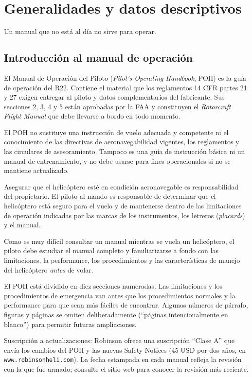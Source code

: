 \chapter{Generalidades y datos descriptivos}
\label{cap:generalidades}

\opening{Un manual que no está al día no sirve para operar.}

\section{Introducción al manual de operación}

El Manual de Operación del Piloto (\emph{Pilot's Operating Handbook}, POH) es la guía de operación del R22. Contiene el material que los reglamentos 14 CFR partes 21 y 27 exigen entregar al piloto y datos complementarios del fabricante. Sus secciones 2, 3, 4 y 5 están aprobadas por la FAA y constituyen el \emph{Rotorcraft Flight Manual} que debe llevarse a bordo en todo momento.

El POH no sustituye una instrucción de vuelo adecuada y competente ni el conocimiento de las directivas de aeronavegabilidad vigentes, los reglamentos y las circulares de asesoramiento. Tampoco es una guía de instrucción básica ni un manual de entrenamiento, y no debe usarse para fines operacionales si no se mantiene actualizado.

Asegurar que el helicóptero esté en condición aeronavegable es responsabilidad del propietario. El piloto al mando es responsable de determinar que el helicóptero está seguro para el vuelo y de mantenerse dentro de las limitaciones de operación indicadas por las marcas de los instrumentos, los letreros (\emph{placards}) y el manual.

Como es muy difícil consultar un manual mientras se vuela un helicóptero, el piloto debe estudiar el manual completo y familiarizarse a fondo con las limitaciones, la performance, los procedimientos y las características de manejo del helicóptero \emph{antes} de volar.

El POH está dividido en diez secciones numeradas. Las limitaciones y los procedimientos de emergencia van antes que los procedimientos normales y la performance para que sean más fáciles de encontrar. Algunos números de párrafo, figuras y páginas se omiten deliberadamente (``páginas intencionalmente en blanco'') para permitir futuras ampliaciones.

\begin{nota}
Suscripción a actualizaciones: Robinson ofrece una suscripción ``Clase A'' que envía los cambios del POH y las nuevas Safety Notices (45 USD por dos años, en \texttt{www.robinsonheli.com}). La fecha estampada en cada manual refleja la revisión con la que fue armado; consulte el sitio web para conocer la revisión más reciente.
\end{nota}

